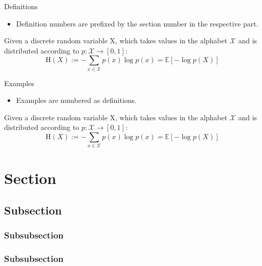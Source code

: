 \documentclass[
11pt,notheorems,hyperref={pdfauthor=whatever}
]{beamer}
\begin{document}
\begin{frame}{}{Definitions}
    \begin{itemize}
        \item Definition numbers are prefixed by the section number in the respective part.
    \end{itemize}
     \begin{definition}
         Given a discrete random variable X, which takes values in the alphabet $\mathcal{X}$ and is distributed according to  $p:{\mathcal {X}}\to [0,1]$:
            \begin{equation}
                \mathrm {H} (X):=-\sum _{x\in {\mathcal {X}}}p(x)\log p(x)=\mathbb {E} [-\log p(X)]
            \end{equation}
    \end{definition}
\end{frame}

\begin{frame}{}{Examples}
    \begin{itemize}
        \item Examples are numbered as definitions.
    \end{itemize}
    \begin{examp}
         Given a discrete random variable X, which takes values in the alphabet $\mathcal{X}$ and is distributed according to  $p:{\mathcal {X}}\to [0,1]$:
            \begin{equation}
                \mathrm {H} (X):=-\sum _{x\in {\mathcal {X}}}p(x)\log p(x)=\mathbb {E} [-\log p(X)]
            \end{equation}
    \end{examp}
\end{frame}


\section{Section}
\subsection{Subsection}
\subsubsection{Subsubsection}
\subsubsection{Subsubsection}
\end{document}

